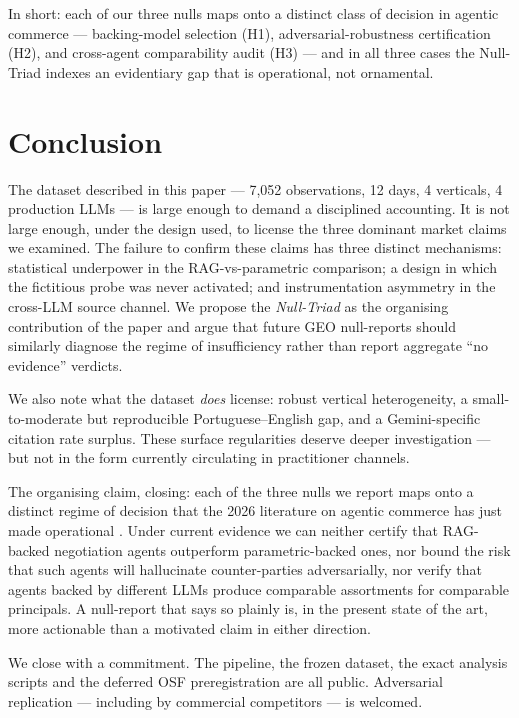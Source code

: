 \documentclass[preprint,12pt,authoryear]{elsarticle}
\begin{document}
\noindent
In short: each of our three nulls maps onto a distinct class of decision in agentic commerce --- backing-model selection (H1), adversarial-robustness certification (H2), and cross-agent comparability audit (H3) --- and in all three cases the Null-Triad indexes an evidentiary gap that is operational, not ornamental.

\section{Conclusion}\label{sec:conclusion}

The dataset described in this paper --- 7{,}052 observations, 12 days, 4 verticals, 4 production LLMs --- is large enough to demand a disciplined accounting. It is not large enough, under the design used, to license the three dominant market claims we examined. The failure to confirm these claims has three distinct mechanisms: statistical underpower in the RAG-vs-parametric comparison; a design in which the fictitious probe was never activated; and instrumentation asymmetry in the cross-LLM source channel. We propose the \emph{Null-Triad} as the organising contribution of the paper and argue that future GEO null-reports should similarly diagnose the regime of insufficiency rather than report aggregate ``no evidence'' verdicts.

We also note what the dataset \emph{does} license: robust vertical heterogeneity, a small-to-moderate but reproducible Portuguese--English gap, and a Gemini-specific citation rate surplus. These surface regularities deserve deeper investigation --- but not in the form currently circulating in practitioner channels.

The organising claim, closing: each of the three nulls we report maps onto a distinct regime of decision that the 2026 literature on agentic commerce has just made operational \citep{Liu2026AgenticPay, Cao2026Solicit, Mao2026SoK}. Under current evidence we can neither certify that RAG-backed negotiation agents outperform parametric-backed ones, nor bound the risk that such agents will hallucinate counter-parties adversarially, nor verify that agents backed by different LLMs produce comparable assortments for comparable principals. A null-report that says so plainly is, in the present state of the art, more actionable than a motivated claim in either direction.

We close with a commitment. The pipeline, the frozen dataset, the exact analysis scripts and the deferred OSF preregistration are all public. Adversarial replication --- including by commercial competitors --- is welcomed.
\end{document}
